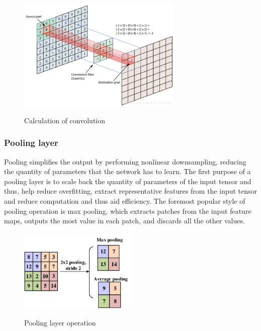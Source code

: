 \documentclass[12pt,a4paper,oneside,english]{book}
\begin{document}
\begin{figure}[H]
    \centering
    \includegraphics[width=0.7\textwidth]{figures/convolution_layer.png}
    \caption{Calculation of convolution}
    \label{fig:convolutional}
    \cite{convolutionLayer}
\end{figure}

\subsubsection{Pooling layer}
Pooling simplifies the output by performing nonlinear downsampling, reducing the quantity of parameters that the network has to learn. The first purpose of a pooling layer is to scale back the quantity of parameters of the input tensor and thus, help reduce overfitting, extract representative features from the input tensor and reduce computation and thus aid efficiency. The foremost popular style of pooling operation is max pooling, which extracts patches from the input feature maps, outputs the most value in each patch, and discards all the other values.

\begin{figure}[H]
    \centering
    \includegraphics[width=0.5\textwidth]{figures/PoolingLayer.png}
    \caption{Pooling layer operation}
    \label{fig:pooling}
    \cite{poolingLayer}
\end{figure}
\end{document}
